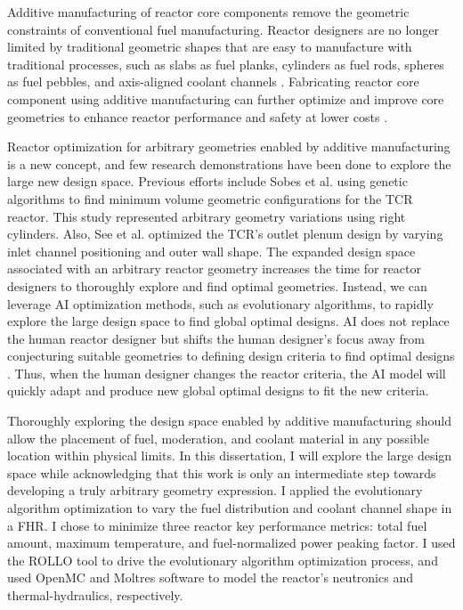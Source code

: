 Additive manufacturing of reactor core components remove the geometric constraints of 
conventional fuel manufacturing. 
Reactor designers are no longer limited by traditional geometric shapes that are easy 
to manufacture with traditional processes, such as slabs as fuel planks, cylinders as 
fuel rods, spheres as fuel pebbles, and axis-aligned coolant channels 
\cite{sobes_artificial_2020}. 
Fabricating reactor core component using additive manufacturing can further optimize 
and improve core geometries to enhance reactor performance and safety at lower costs 
\cite{bergeron_early_2018}.

Reactor optimization for arbitrary geometries enabled by additive manufacturing is a 
new concept, and few research demonstrations have been done to explore the large 
new design space. 
Previous efforts include Sobes et al. \cite{sobes_artificial_2020} using genetic 
algorithms to find minimum volume geometric configurations for the TCR reactor. 
This study represented arbitrary geometry variations using right cylinders. 
Also, See et al. \cite{see_design_2022} optimized the TCR's outlet plenum design 
by varying inlet channel positioning and outer wall shape.  
The expanded design space associated with an arbitrary reactor geometry increases 
the time for reactor designers to thoroughly explore and find optimal geometries. 
Instead, we can leverage \gls{AI} optimization methods, such as evolutionary algorithms, 
to rapidly explore the large design space to find global optimal designs. 
\gls{AI} does not replace the human reactor designer but shifts the human designer's 
focus away from conjecturing suitable geometries to defining design criteria to 
find optimal designs \cite{sobes_artificial_2020}. 
Thus, when the human designer changes the reactor criteria, the AI model will quickly 
adapt and produce new global optimal designs to fit the new criteria.

Thoroughly exploring the design space enabled by additive manufacturing should allow 
the placement of fuel, moderation, and coolant material in any possible location 
within physical limits. 
In this dissertation, I will explore the large design space while acknowledging that 
this work is only an intermediate step towards developing a truly arbitrary 
geometry expression. 
I applied the evolutionary algorithm optimization to vary the fuel distribution and 
coolant channel shape in a \gls{FHR}. 
I chose to minimize three reactor key performance metrics: total fuel amount, maximum 
temperature, and fuel-normalized power peaking factor. 
I used the ROLLO tool \cite{chee_rollo_2021} to drive the evolutionary algorithm 
optimization process, and used OpenMC \cite{romano_openmc:_2015} and Moltres 
\cite{lindsay_introduction_2018} software to model the reactor's neutronics and 
thermal-hydraulics, respectively.  

